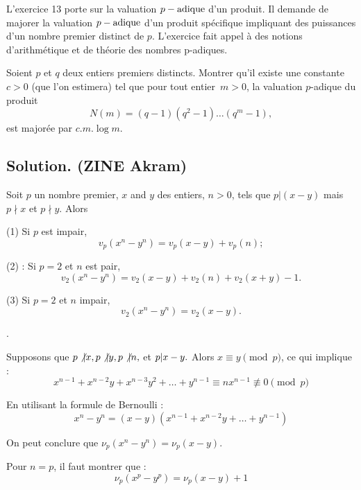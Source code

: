 L'exercice 13 porte sur la valuation $p - \operatorname{adique}$ d'un produit. Il
demande de majorer la valuation $p - \operatorname{adique}$ d'un produit
sp{\'e}cifique impliquant des puissances d'un nombre premier distinct de $p$.
L'exercice fait appel {\`a} des notions d'arithm{\'e}tique et de th{\'e}orie
des nombres p-adiques.

\begin{exercise}
Soient $p$ et $q$ deux entiers premiers distincts. Montrer qu'il existe une
constante $c > 0$ (que l'on estimera) tel que pour tout entier~$m > 0$, la
valuation $p$-adique du produit
\[ N (m) = (q - 1)  (q^2 - 1) \ldots (q^m - 1), \]
est major{\'e}e par $c.m. \log m$.
\end{exercise}

\subsection*{Solution. (ZINE Akram)}



Soit $p$ un nombre premier, $x$ and $y$ des entiers, $n > 0$, tels que $p| (x
- y)$ mais $p \nmid x$ et $p \nmid y$. Alors

(1) Si $p$ est impair,
\[ v_p  (x^n - y^n) = v_p  (x - y) + v_p (n) ; \]


(2) : Si $p = 2$ et $n$ est pair,
\[ v_2  (x^n - y^n) = v_2  (x - y) + v_2 (n) + v_2  (x + y) - 1. \]


(3) Si $p = 2$ et $n$ impair,
\[ v_2  (x^n - y^n) = v_2  (x - y) . \]



.

Supposons que $p \not{| } x, p \not{| } y, p \not{|
} n,$ et $p |  x - y.$ Alors $x \equiv y \pmod{p}$, ce qui
implique :
\[ x^{n - 1} + x^{n - 2} y + x^{n - 3} y^2 + \ldots + y^{n - 1} \equiv nx^{n -
   1} \nequiv 0 \pmod{p} \]


En utilisant la formule de Bernoulli :
\[ x^n - y^n = (x - y)  (x^{n - 1} + x^{n - 2} y + \ldots + y^{n - 1}) \]


On peut conclure que $\nu_p  (x^n - y^n) = \nu_p  (x - y)$.


Pour $n = p$, il faut montrer que :
\[ \nu_p  (x^p - y^p) = \nu_p  (x - y) + 1 \]


